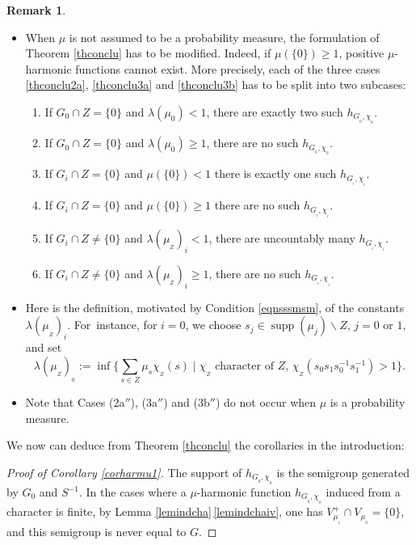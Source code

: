\documentclass[JEP,XML,SOM,Unicode]{cedram}
\DeclareMathOperator{\supp}{supp}
\theoremstyle{definition}
\newtheorem{Rem}[Thm]{Remark}
\let\la\lambda
\begin{document}
\enlargethispage{-\baselineskip}%
\pagebreak[2]
\skpt
\begin{Rem}
\label{remconclu}
\begin{itemize}
\item
When $\mu$ is not assumed to be a probability measure,
the formulation of Theorem \ref{thconclu} has to be modified.
Indeed, if $\mu (\{ 0\})\geq 1$,
positive $\mu$-harmonic functions cannot exist.
More precisely, each of the three cases \eqref{thconclu2a}, \eqref{thconclu3a} and \eqref{thconclu3b}
has to be split into two subcases:
\begin{enumerate}
\item[(2a$'$)] If $G_0\cap Z = \{ 0\}$ and $\la(\mu_0)< 1$,
there are exactly two such $h_{G_{_0},\chi_{_0}}$. 
\item[(2a$''$)] If $G_0\cap Z = \{ 0\}$ and $\la(\mu_0)\geq 1$,
there are no such $h_{G_{_0},\chi_{_0}}$.
\item[(3a$'$)] If $G_i\cap Z = \{ 0\}$ and $\mu(\{ 0\})< 1$
there is exactly one such $h_{G_{_i},\chi_{_i}}$.
\item[(3a$''$)] If $G_i\cap Z = \{ 0\}$ and $\mu(\{ 0\})\geq 1$
there are no such $h_{G_{_i},\chi_{_i}}$.
\item[(3b$'$)] If $G_i\cap Z\neq \{ 0\}$
and
$\la(\mu_{_Z})_i\!<\! 1$,\!
there are uncountably many $h_{G_{_i},\chi_{_i}}$.
\item[(3b$''$)] If $G_i\cap Z \neq \{ 0\}$ and
$\la(\mu_{_Z})_i\geq 1$,
there are no such $h_{G_{_i},\chi_{_i}}$.
\end{enumerate}
\item
Here is the definition,
motivated by Condition \eqref{eqnsssmsm}, of the constants $\la(\mu_{_Z})_i$.
For~instance, for $i=0$, we choose $s_j\in \supp(\mu_j)\smallsetminus Z$,
$j=0$ or $1$,
and set\vspace*{-3pt}\enlargethispage{.5\baselineskip}%
\[\textstyle
\la(\mu_{_Z})_{_0}:=\inf\bigl\{\sum_{s\in Z}\mu_s\chi_{_Z}(s)\mid \chi_{_Z}
\text{ character of $Z$, $\chi_{_Z}(s_0s_1s_0^{-1}s_1^{-1})>1$}\bigr\}.
\]
\item
Note that Cases (2a$''$), (3a$''$) and (3b$''$) do not occur
when $\mu$ is a probability measure.
\end{itemize}
\end{Rem}

We now can deduce from Theorem \ref{thconclu} the corollaries in the
introduction:

\begin{proof}[Proof of Corollary \ref{corharmu1}]
The support of $h_{G_{_0},\chi_{_0}}$
is the semigroup generated by $G_0$ and $S^{-1}$.
In the cases where a $\mu$-harmonic function
$h_{G_{_0},\chi_{_0}}$ induced from a character is finite,
by Lemma \ref{lemindcha}\,\eqref{lemindchaiv}, one has $V^+_{\mu_{_1}}\cap V_{\mu_{_0}}=\{0\}$,
and this semigroup is never equal to $G$.
\end{proof}
\end{document}

